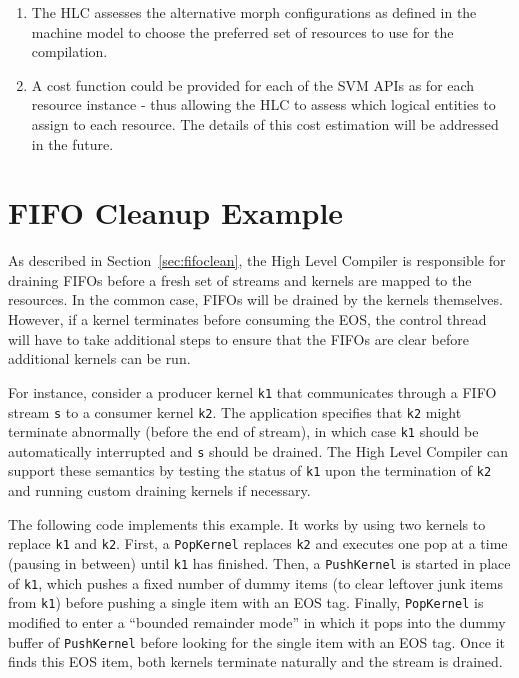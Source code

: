 \begin{enumerate}
\item The HLC assesses the alternative morph configurations as defined
in the machine model to choose the preferred set of resources to use
for the compilation.

\item A cost function could be provided for each of the SVM APIs as
for each resource instance - thus allowing the HLC to assess which
logical entities to assign to each resource.  The details of this cost
estimation will be addressed in the future.

\end{enumerate}

\appendix

\clearpage
\section{FIFO Cleanup Example}  %
\label{sec:fifocleanexample}
As described in Section~\ref{sec:fifoclean}, the High Level Compiler
is responsible for draining FIFOs before a fresh set of streams and
kernels are mapped to the resources.  In the common case, FIFOs will
be drained by the kernels themselves.  However, if a kernel terminates
before consuming the EOS, the control thread will have to take
additional steps to ensure that the FIFOs are clear before additional
kernels can be run.

For instance, consider a producer kernel {\tt k1} that communicates
through a FIFO stream {\tt s} to a consumer kernel {\tt k2}.  The
application specifies that {\tt k2} might terminate abnormally (before
the end of stream), in which case {\tt k1} should be automatically
interrupted and {\tt s} should be drained.  The High Level Compiler
can support these semantics by testing the status of {\tt k1} upon the
termination of {\tt k2} and running custom draining kernels if
necessary.  

The following code implements this example.  It works by using two
kernels to replace {\tt k1} and {\tt k2}.  First, a {\tt PopKernel}
replaces {\tt k2} and executes one pop at a time (pausing in between)
until {\tt k1} has finished.  Then, a {\tt PushKernel} is started in
place of {\tt k1}, which pushes a fixed number of dummy items (to
clear leftover junk items from {\tt k1}) before pushing a single item
with an EOS tag.  Finally, {\tt PopKernel} is modified to enter a
``bounded remainder mode'' in which it pops into the dummy buffer of
{\tt PushKernel} before looking for the single item with an EOS tag.
Once it finds this EOS item, both kernels terminate naturally and the
stream is drained.

